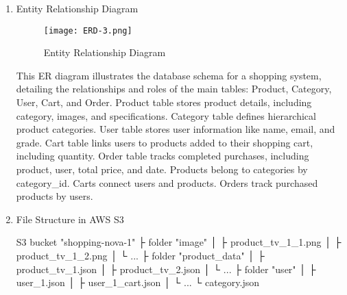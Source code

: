 \documentclass[conference]{IEEEtran}
\begin{document}
\begin{enumerate}

\item Entity Relationship Diagram
\begin{figure}[H]
    \centering
    \texttt{[image: ERD-3.png]}
    \caption{Entity Relationship Diagram}
    \label{fig:entity-relationship diagram}
\end{figure}
\hspace*{2ex}
This ER diagram illustrates the database schema for a shopping system, detailing the relationships and roles of the main tables: Product, Category, User, Cart, and Order. Product table stores product details, including category, images, and specifications.
Category table defines hierarchical product categories.
User table stores user information like name, email, and grade.
Cart table links users to products added to their shopping cart, including quantity.
Order table tracks completed purchases, including product, user, total price, and date.
Products belong to categories by category\_id.
Carts connect users and products.
Orders track purchased products by users.

\item File Structure in AWS S3 

S3 bucket "shopping-nova-1" \newline\hspace*{2.5ex}
├ folder "image" \newline\hspace*{2.5ex}
│     ├ product\_tv\_1\_1.png \newline\hspace*{2.5ex}
│     ├ product\_tv\_1\_2.png \newline\hspace*{2.5ex}
│     └ ... \newline\hspace*{2.5ex}
├ folder "product\_data" \newline\hspace*{2.5ex}
│     ├ product\_tv\_1.json \newline\hspace*{2.5ex}
│     ├ product\_tv\_2.json \newline\hspace*{2.5ex}
│     └ ...  \newline\hspace*{2.5ex}
├ folder "user" \newline\hspace*{2.5ex}
│     ├ user\_1.json \newline\hspace*{2.5ex}
│     ├ user\_1\_cart.json\newline\hspace*{2.5ex}
│     └ ...\newline\hspace*{2.5ex}
└ category.json


\end{enumerate}
\end{document}
